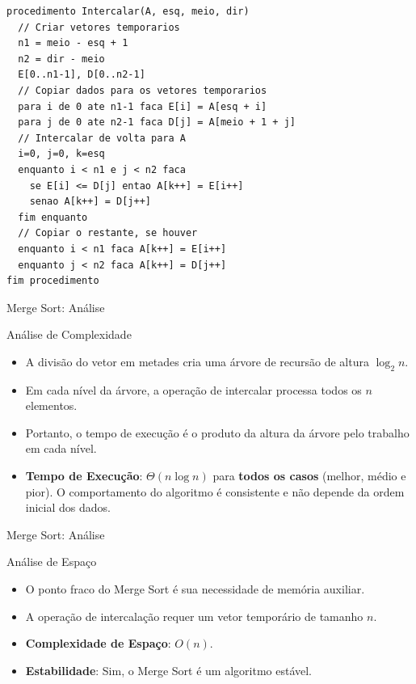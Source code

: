 \documentclass{beamer}
\begin{document}
\begin{frame}[fragile]{}
\begin{lstlisting}
procedimento Intercalar(A, esq, meio, dir)
  // Criar vetores temporarios
  n1 = meio - esq + 1
  n2 = dir - meio
  E[0..n1-1], D[0..n2-1]
  // Copiar dados para os vetores temporarios
  para i de 0 ate n1-1 faca E[i] = A[esq + i]
  para j de 0 ate n2-1 faca D[j] = A[meio + 1 + j]
  // Intercalar de volta para A
  i=0, j=0, k=esq
  enquanto i < n1 e j < n2 faca
    se E[i] <= D[j] entao A[k++] = E[i++]
    senao A[k++] = D[j++]
  fim enquanto
  // Copiar o restante, se houver
  enquanto i < n1 faca A[k++] = E[i++]
  enquanto j < n2 faca A[k++] = D[j++]
fim procedimento
\end{lstlisting}
\end{frame}

\begin{frame}{Merge Sort: Análise}
\begin{block}{Análise de Complexidade}
\begin{itemize}
 \item A divisão do vetor em metades cria uma árvore de recursão de altura $\log_2 n$.
 \item Em cada nível da árvore, a operação de intercalar processa todos os $n$ elementos.
 \item Portanto, o tempo de execução é o produto da altura da árvore pelo trabalho em cada nível.
 \item \textbf{Tempo de Execução}: $\Theta(n \log n)$ para \textbf{todos os casos} (melhor, médio e pior). O comportamento do algoritmo é consistente e não depende da ordem inicial dos dados.
\end{itemize}
\end{block}

\end{frame}


\begin{frame}{Merge Sort: Análise}

\begin{block}{Análise de Espaço}
\begin{itemize}
    \item O ponto fraco do Merge Sort é sua necessidade de memória auxiliar.
    \item A operação de intercalação requer um vetor temporário de tamanho $n$.
    \item \textbf{Complexidade de Espaço}: $O(n)$.
    \item \textbf{Estabilidade}: Sim, o Merge Sort é um algoritmo estável.
\end{itemize}
\end{block}
\end{frame}
\end{document}
